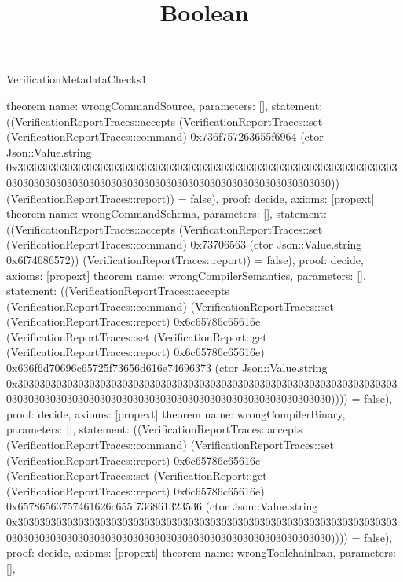 \begin{lexlean}{VerificationMetadataChecks1}
\title{Boolean}
\begin{semanticmodule}
theorem{
  name: wrongCommandSource,
  parameters: [],
  statement: ((VerificationReportTraces::accepts (VerificationReportTraces::set (VerificationReportTraces::command) 0x736f757263655f6964 (ctor Json::Value.string 0x30303030303030303030303030303030303030303030303030303030303030303030303030303030303030303030303030303030303030303030303030303030)) (VerificationReportTraces::report)) = false),
  proof: decide{},
  axioms: [propext]
}
theorem{
  name: wrongCommandSchema,
  parameters: [],
  statement: ((VerificationReportTraces::accepts (VerificationReportTraces::set (VerificationReportTraces::command) 0x73706563 (ctor Json::Value.string 0x6f74686572)) (VerificationReportTraces::report)) = false),
  proof: decide{},
  axioms: [propext]
}
theorem{
  name: wrongCompilerSemantics,
  parameters: [],
  statement: ((VerificationReportTraces::accepts (VerificationReportTraces::command) (VerificationReportTraces::set (VerificationReportTraces::report) 0x6c65786c65616e (VerificationReportTraces::set (VerificationReport::get (VerificationReportTraces::report) 0x6c65786c65616e) 0x636f6d70696c65725f73656d616e74696373 (ctor Json::Value.string 0x30303030303030303030303030303030303030303030303030303030303030303030303030303030303030303030303030303030303030303030303030303030)))) = false),
  proof: decide{},
  axioms: [propext]
}
theorem{
  name: wrongCompilerBinary,
  parameters: [],
  statement: ((VerificationReportTraces::accepts (VerificationReportTraces::command) (VerificationReportTraces::set (VerificationReportTraces::report) 0x6c65786c65616e (VerificationReportTraces::set (VerificationReport::get (VerificationReportTraces::report) 0x6c65786c65616e) 0x65786563757461626c655f736861323536 (ctor Json::Value.string 0x30303030303030303030303030303030303030303030303030303030303030303030303030303030303030303030303030303030303030303030303030303030)))) = false),
  proof: decide{},
  axioms: [propext]
}
theorem{
  name: wrongToolchainlean,
  parameters: [],
}
\end{semanticmodule}
\end{lexlean}
